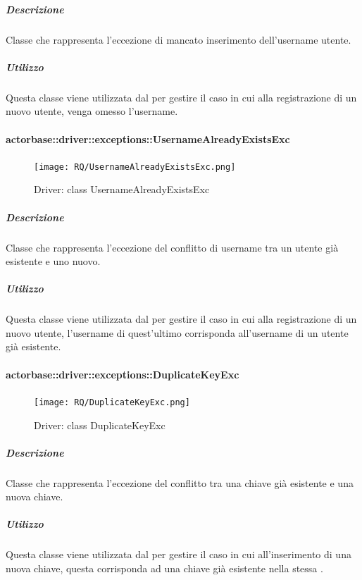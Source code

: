 \documentclass{scalatekids-article}
\begin{document}
\subparagraph{Descrizione}

Classe che rappresenta l'eccezione di mancato inserimento dell'username utente.

\subparagraph{Utilizzo}

Questa classe viene utilizzata dal  per gestire il caso in cui alla registrazione di un nuovo utente, venga omesso l'username.

\paragraph{actorbase::driver::exceptions::UsernameAlreadyExistsExc}

\begin{figure}[H]
  \begin{center}
    \texttt{[image: RQ/UsernameAlreadyExistsExc.png]}
    \caption{Driver: class UsernameAlreadyExistsExc}
  \end{center}
\end{figure}

\subparagraph{Descrizione}

Classe che rappresenta l'eccezione del conflitto di username tra un utente già esistente e uno nuovo.

\subparagraph{Utilizzo}

Questa classe viene utilizzata dal  per gestire il caso in cui alla registrazione di un nuovo utente, l'username di quest'ultimo corrisponda all'username di un utente già esistente.

\paragraph{actorbase::driver::exceptions::DuplicateKeyExc}

\begin{figure}[H]
  \begin{center}
    \texttt{[image: RQ/DuplicateKeyExc.png]}
    \caption{Driver: class DuplicateKeyExc}
  \end{center}
\end{figure}

\subparagraph{Descrizione}

Classe che rappresenta l'eccezione del conflitto tra una chiave già esistente e una nuova chiave.

\subparagraph{Utilizzo}

Questa classe viene utilizzata dal  per gestire il caso in cui all'inserimento di una nuova chiave, questa corrisponda ad una chiave già esistente nella stessa .
\end{document}
